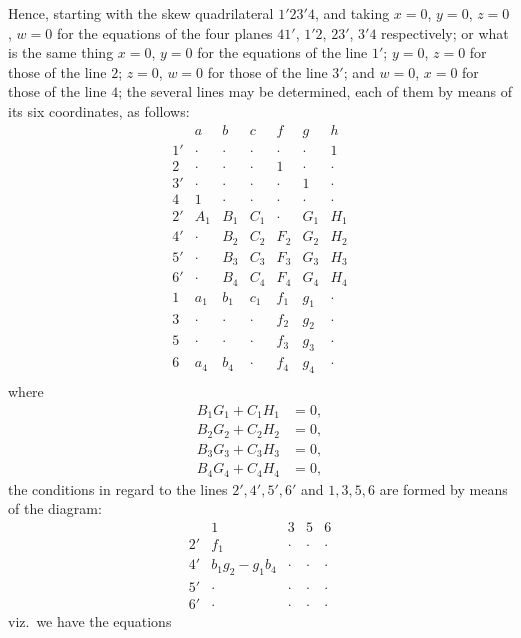 \documentclass[11pt,a4paper]{article}
\begin{document}
Hence, starting with the skew quadrilateral $1' 2 3' 4$, and taking
$x = 0$, $y = 0$, $z = 0$, $w = 0$ for the equations of the four planes
$4 1'$, $1' 2$, $2 3'$, $3' 4$ respectively; or what is the same thing
$x = 0$, $y = 0$ for the equations of the line $1'$; $y = 0$, $z = 0$
for those of the line $2$; $z = 0$, $w = 0$ for those of the line $3'$;
and $w = 0$, $x = 0$ for those of the line $4$; the several lines may be
determined, each of them by means of its six coordinates, as follows:
\[
\renewcommand{\arraystretch}{1.15}
\begin{array}{c|cccccc}
   & a & b & c & f & g & h \\\hline
1' & \cdot & \cdot & \cdot & \cdot & \cdot & 1 \\
2  & \cdot & \cdot & \cdot & 1 & \cdot & \cdot \\
3' & \cdot & \cdot & \cdot & \cdot & 1 & \cdot \\
4  & 1 & \cdot & \cdot & \cdot & \cdot & \cdot \\
2' & A_1 & B_1 & C_1 & \cdot & G_1 & H_1 \\
4' & \cdot & B_2 & C_2 & F_2 & G_2 & H_2 \\
5' & \cdot & B_3 & C_3 & F_3 & G_3 & H_3 \\
6' & \cdot & B_4 & C_4 & F_4 & G_4 & H_4 \\
1  & a_1 & b_1 & c_1 & f_1 & g_1 & \cdot \\
3  & \cdot & \cdot & \cdot & f_2 & g_2 & \cdot \\
5  & \cdot & \cdot & \cdot & f_3 & g_3 & \cdot \\
6  & a_4 & b_4 & \cdot & f_4 & g_4 & \cdot \\
\end{array}
\]
where
\[
\begin{aligned}
B_1 G_1 + C_1 H_1 &= 0,\\
B_2 G_2 + C_2 H_2 &= 0,\\
B_3 G_3 + C_3 H_3 &= 0,\\
B_4 G_4 + C_4 H_4 &= 0,
\end{aligned}
\]
the conditions in regard to the lines $2', 4', 5', 6'$ and $1, 3, 5, 6$
are formed by means of the diagram:
\[
\begin{array}{c|cccc}
   & 1 & 3 & 5 & 6 \\\hline
2' & f_1 & \cdot & \cdot & \cdot \\
4' & b_1 g_2 - g_1 b_4 & \cdot & \cdot & \cdot \\
5' & \cdot & \cdot & \cdot & \cdot \\
6' & \cdot & \cdot & \cdot & \cdot
\end{array}
\]
viz.\ we have the equations
\end{document}
